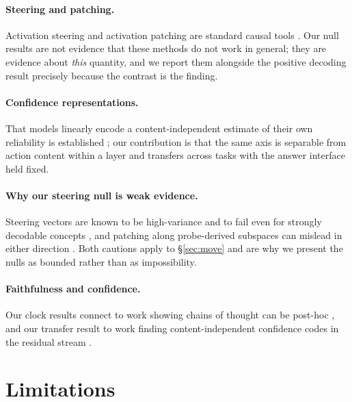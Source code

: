 \documentclass{article}
\begin{document}
\paragraph{Steering and patching.} Activation steering and activation patching are standard
causal tools \citep{turner2023, meng2022}. Our null results are not evidence that these
methods do not work in general; they are evidence about \emph{this} quantity, and we report
them alongside the positive decoding result precisely because the contrast is the finding.

\paragraph{Confidence representations.} That models linearly encode a content-independent
estimate of their own reliability is established \citep{kadavath2022}; our contribution is
that the same axis is separable from action content within a layer and transfers across
tasks with the answer interface held fixed.

\paragraph{Why our steering null is weak evidence.} Steering vectors are known to be
high-variance and to fail even for strongly decodable concepts \citep{rimsky2024}, and
patching along probe-derived subspaces can mislead in either direction \citep{makelov2023}.
Both cautions apply to \S\ref{sec:move} and are why we present the nulls as bounded rather
than as impossibility.

\paragraph{Faithfulness and confidence.} Our clock results connect to work showing chains of
thought can be post-hoc \citep{turpin2023, lanham2023}, and our transfer result to work
finding content-independent confidence codes in the residual stream \citep{twostage2026}.

\section{Limitations}
\end{document}
